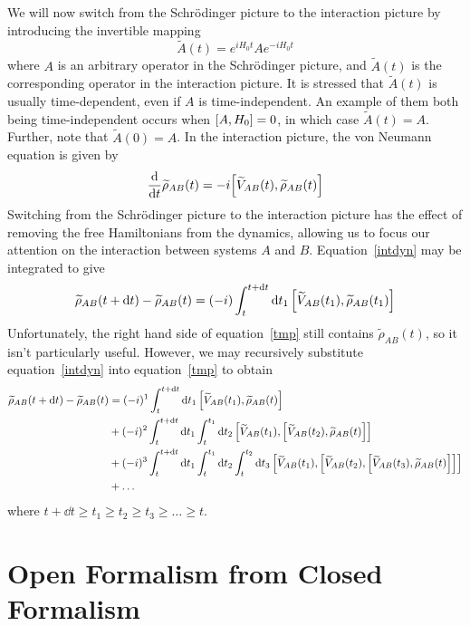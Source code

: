\documentclass{article}
\newcommand{\til}[1]{\widetilde{#1}}
\begin{document}
We will now switch from the Schr{\"o}dinger picture to the interaction picture by introducing the invertible mapping
\begin{equation}\label{intpic}
\til{A}(t) = e^{iH_0t}Ae^{-iH_0t}
\end{equation}
where $A$ is an arbitrary operator in the Schr{\"o}dinger picture, and $\til{A}(t)$ is the corresponding operator in the interaction picture. It is stressed that $\til{A}(t)$ is usually time-dependent, even if $A$ is time-independent. An example of them both being time-independent occurs when $\comm{A}{H_0} = 0$, in which case $\til{A}(t) = A$. Further, note that $\til{A}(0) = A$. In the interaction picture, the von Neumann equation is given by
\begin{equation}\label{intdyn}
\dv{t}\til{\rho}_{AB}(t) = -i\comm{\til{V}_{AB}(t)}{\til{\rho}_{AB}(t)}
\end{equation}
Switching from the Schr{\"o}dinger picture to the interaction picture has the effect of removing the free Hamiltonians from the dynamics, allowing us to focus our attention on the interaction between systems $A$ and $B$. Equation~\ref{intdyn} may be integrated to give
\begin{equation}\label{tmp}
\til{\rho}_{AB}(t+\dd{t}) - \til{\rho}_{AB}(t) = (-i)\int_t^{t+\dd{t}}\dd{t_1}\comm{\til{V}_{AB}(t_1)}{\til{\rho}_{AB}(t_1)}
\end{equation}
Unfortunately, the right hand side of equation~\ref{tmp} still contains $\til{\rho}_{AB}(t)$, so it isn't particularly useful. However, we may recursively substitute equation~\ref{intdyn} into equation~\ref{tmp} to obtain
\begin{align}\label{totintpert}
\begin{split}
\til{\rho}_{AB}(t+\dd{t}) - \til{\rho}_{AB}(t) &= (-i)^1\int_t^{t+\dd{t}}\dd{t_1}\comm{\til{V}_{AB}(t_1)}{\til{\rho}_{AB}(t)}\\
&+(-i)^2\int_t^{t+\dd{t}}\dd{t_1}\int_t^{t_1}\dd{t_2}\comm{\til{V}_{AB}(t_1)}{\comm{\til{V}_{AB}(t_2)}{\til{\rho}_{AB}(t)}}\\
&+(-i)^3\int_t^{t+\dd{t}}\dd{t_1}\int_t^{t_1}\dd{t_2}\int_t^{t_2}\dd{t_3}\comm{\til{V}_{AB}(t_1)}{\comm{\til{V}_{AB}(t_2)}{\comm{\til{V}_{AB}(t_3)}{\til{\rho}_{AB}(t)}}}\\
&+\ldots
\end{split}
\end{align}
where $t+\dd{t}\geq t_1\geq t_2\geq t_3\geq \ldots\geq t$.

\section{Open Formalism from Closed Formalism}
\end{document}
